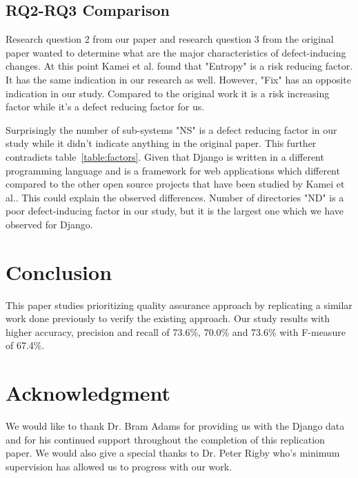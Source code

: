 \documentclass[10pt, conference]{IEEEtran}
\begin{document}
\subsection{RQ2-RQ3 Comparison}
\label{sec:comp-rq23}

Research question 2 from our paper and research question 3 from the original paper wanted to determine what are the major characteristics of defect-inducing changes. At this point Kamei et al. found that "Entropy" is a risk reducing factor. It has the same indication in our research as well. However, "Fix" has an opposite indication in our study. Compared to the original work it is a risk increasing factor while it's a defect reducing factor for us.

Surprisingly the number of sub-systems "NS" is a defect reducing factor in our study while it didn't indicate anything in the original paper. This further contradicts table~\ref{table:factors}. Given that Django is written in a different programming language and is a framework for web applications which different compared to the other open source projects that have been studied by Kamei et al.. This could explain the observed differences. Number of directories "ND" is a poor defect-inducing factor in our study, but it is the largest one which we have observed for Django.

\section{Conclusion}
\label{sec:conclusion}

This paper studies prioritizing quality assurance approach by replicating a similar work done previously to verify the existing approach. Our study results with higher accuracy, precision and recall of 73.6\%, 70.0\% and 73.6\% with F-measure of 67.4\%.

\section*{Acknowledgment}
We would like to thank Dr. Bram Adams for providing us with the Django data and for his continued support throughout the completion of this replication paper. We would also give a special thanks to Dr. Peter Rigby who's minimum supervision has allowed us to progress with our work.

\balance


\end{document}
